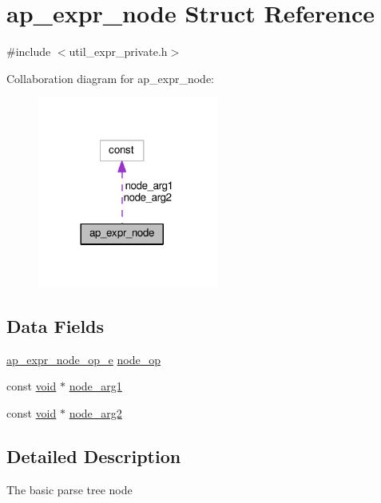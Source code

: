 \hypertarget{structap__expr__node}{}\section{ap\+\_\+expr\+\_\+node Struct Reference}
\label{structap__expr__node}


{\ttfamily \#include $<$util\+\_\+expr\+\_\+private.\+h$>$}



Collaboration diagram for ap\+\_\+expr\+\_\+node\+:
\nopagebreak
\begin{figure}[H]
\begin{center}
\leavevmode
\includegraphics[width=168pt]{structap__expr__node__coll__graph}
\end{center}
\end{figure}
\subsection*{Data Fields}
\begin{DoxyCompactItemize}
\item 
\hyperlink{util__expr__private_8h_a51ae656ac75e1b9ad2c15b5f1f64faa5}{ap\+\_\+expr\+\_\+node\+\_\+op\+\_\+e} \hyperlink{structap__expr__node_a5a3b5aa29dda5016e9b4395f8d13bb68}{node\+\_\+op}
\item 
const \hyperlink{group__MOD__ISAPI_gacd6cdbf73df3d9eed42fa493d9b621a6}{void} $\ast$ \hyperlink{structap__expr__node_a7a92cd94ac023bfb5323bf67f479872d}{node\+\_\+arg1}
\item 
const \hyperlink{group__MOD__ISAPI_gacd6cdbf73df3d9eed42fa493d9b621a6}{void} $\ast$ \hyperlink{structap__expr__node_a6628e97b8f9d33e1d9a1c7d6c745bf01}{node\+\_\+arg2}
\end{DoxyCompactItemize}


\subsection{Detailed Description}
The basic parse tree node 

